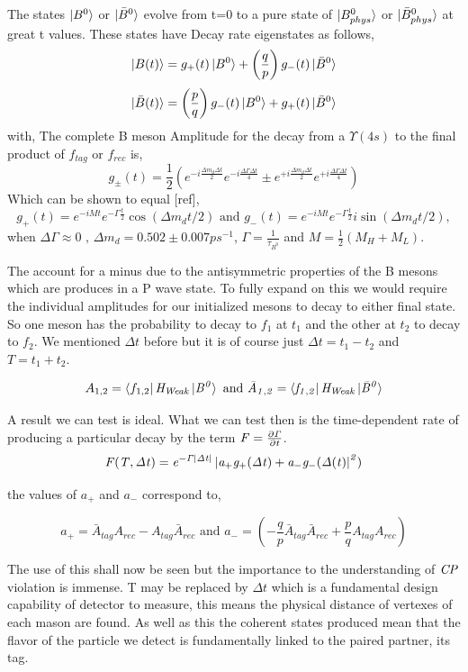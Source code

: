 The states $\ket{B^{0}}$ or $\ket{\bar{B}^{0}}$ evolve from t=0 to a pure state of $\ket{B_{phys}^{0}}$ or $\ket{\bar{B}^{0}_{phys}}$ at great t values. 
These states have Decay rate eigenstates as follows,
\[\ket{B(t)}= g_+(t)\ket{B^0}+\left(\frac{q}{p}\right)g_{-}(t)\ket{\bar{B}^0}\]
\[\ket{\bar{B}(t)}= \left(\frac{p}{q}\right)g_-(t)\ket{B^0}+g_{+}(t)\ket{\bar{B}^0}\]
with,
The complete B meson Amplitude for the decay from a $\Upsilon(4s)$ to the final product of $f_{tag}$ or $f_{rec}$ is,
 \[g_{\pm}(t)=\frac{1}{2}(e^{-i\frac{\Delta m_d \Delta t}{2}}e^{-i\frac{\Delta\Gamma \Delta t}{4}}\pm e^{+i\frac{\Delta m_d \Delta t}{2}}e^{+i\frac{\Delta\Gamma \Delta t}{4}})\]
Which can be shown to equal [ref],
\[g_{+}(t)=e^{-iMt}e^{-\Gamma\frac{t}{2}}\cos(\Delta m_d t/2) \mbox{ and }g_{-}(t)=e^{-iMt}e^{-\Gamma\frac{t}{2}}i\sin(\Delta m_d t/2),\]
when $\Delta\Gamma \approx 0 \mbox{ , }\Delta m_d = 0.502 \pm 0.007 ps^{-1}$, $\Gamma = \frac{1}{\tau_{B^0}}$ and $M=\frac{1}{2}(M_H+M_L)$.

The account for a minus due to the antisymmetric properties of the B mesons which are produces in a P wave state. To fully expand on this we would require the individual amplitudes for our initialized mesons to decay to either final state. So one meson has the probability to decay to $f_1$ at $t_1$ and the other at $t_2$ to decay to $f_2$. We mentioned $\Delta t$ before but it is of course just $\Delta t = t_1 -t_2$ and $T= t_1 +t_2$.

\[A_{1,2}=\bra{f_{1,2}}\it{H_{Weak}}\ket{B^{0}} \mbox{ and } \bar{A}_{1,2}=\bra{f_{1,2}}\it{H_{Weak}}\ket{\bar{B}^{0}}\]

A result we can test is ideal. What we can test then is the time-dependent rate of producing a particular decay by the term $\it{F}=\frac{\partial\Gamma}{\partial t}$. 
\[\it{F}(T,\Delta t)=e^{-\Gamma\left|\Delta t\right|}\left| a_{+}g_{+}(\Delta t)+ a_{-}g_{-}(\Delta (t) \right|^{2})\]

the values of $a_+$ and $a_-$ correspond to,

\[ a_{+}=\bar{A}_{tag}A_{rec}-A_{tag}\bar{A}_{rec} \mbox{ and }a_{-}=\left(-\frac{q}{p}\bar{A}_{tag}\bar{A}_{rec}+\frac{p}{q}A_{tag}A_{rec}\right)\]

The use of this shall now be seen but the importance to the understanding of $\it{CP}$ violation is immense. T may be replaced by $\Delta t$ which is a fundamental design capability of detector to measure, this means the physical distance of vertexes of each mason are found. As well as this the coherent states produced mean that the flavor of the particle we detect is fundamentally linked to the paired partner, its tag.


